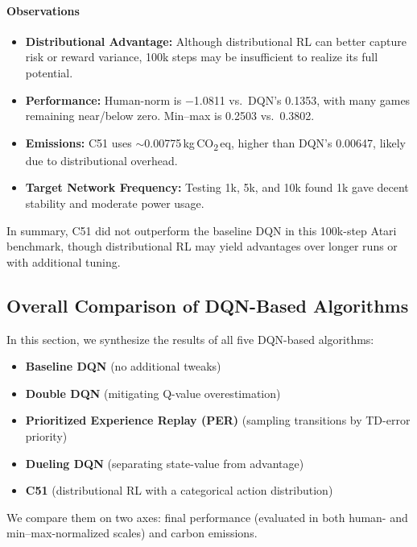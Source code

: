 \paragraph{Observations}
\begin{itemize}
	\item \textbf{Distributional Advantage:} 
	Although distributional RL can better capture risk or reward variance, 
	100k steps may be insufficient to realize its full potential.
	\item \textbf{Performance:} 
	Human-norm is \num{-1.0811} vs.\ DQN's \num{0.1353}, with many games remaining near/below zero. 
	Min--max is \num{0.2503} vs.\ \num{0.3802}.
	\item \textbf{Emissions:}
	C51 uses $\sim$\num{0.00775}\,kg\,CO\textsubscript{2}\,eq, higher than DQN's \num{0.00647}, 
	likely due to distributional overhead.
	\item \textbf{Target Network Frequency:}
	Testing 1k, 5k, and 10k found 1k gave decent stability and moderate power usage.
\end{itemize}

In summary, C51 did not outperform the baseline DQN in this 100k-step Atari benchmark, 
though distributional RL may yield advantages over longer runs or with additional tuning.


\subsection{Overall Comparison of DQN-Based Algorithms}
\label{subsec:dqn_overall_comparison}

In this section, we synthesize the results of all five DQN-based algorithms:
\begin{itemize}
	\item \textbf{Baseline DQN} (no additional tweaks)
	\item \textbf{Double DQN} (mitigating Q-value overestimation)
	\item \textbf{Prioritized Experience Replay (PER)} (sampling transitions by TD-error priority)
	\item \textbf{Dueling DQN} (separating state-value from advantage)
	\item \textbf{C51} (distributional RL with a categorical action distribution)
\end{itemize}
We compare them on two axes: final performance (evaluated in both human- and min--max-normalized scales) and carbon emissions. 

